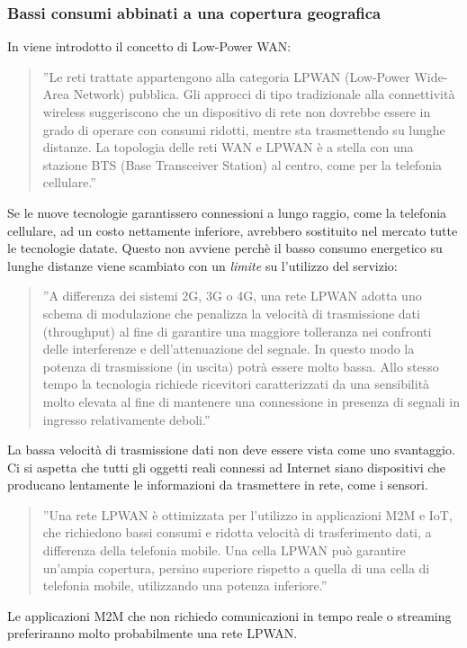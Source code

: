\documentclass[a4paper]{report} %
\begin{document}
\subsubsection{Bassi consumi abbinati a una copertura geografica}
In \cite{art:rif.23} viene introdotto il concetto di Low-Power WAN:
\begin{quote}
	''Le reti trattate appartengono alla categoria LPWAN (Low-Power Wide-Area Network) pubblica. Gli approcci di tipo tradizionale alla connettività wireless suggeriscono che un dispositivo di rete non dovrebbe essere in grado di operare con consumi ridotti, mentre sta trasmettendo su lunghe distanze. La topologia delle reti WAN e LPWAN è a stella con una stazione BTS (Base Transceiver Station) al centro, come per la telefonia cellulare.'' 
\end{quote}	
Se le nuove tecnologie garantissero connessioni a lungo raggio, come la telefonia cellulare, ad un costo nettamente inferiore, avrebbero sostituito nel mercato tutte le tecnologie datate. Questo non avviene perchè il basso consumo energetico su lunghe distanze viene scambiato con un \textit{limite} su l'utilizzo del servizio:
\begin{quote}
	''A differenza dei sistemi 2G, 3G o 4G, una rete LPWAN adotta uno schema di modulazione che penalizza la velocità di trasmissione dati (throughput) al fine di garantire una maggiore tolleranza nei confronti delle interferenze e dell'attenuazione del segnale. In questo modo la potenza di trasmissione (in uscita) potrà essere molto bassa. Allo stesso tempo la tecnologia richiede ricevitori caratterizzati da una sensibilità molto elevata al fine di mantenere una connessione in presenza di segnali in ingresso relativamente deboli.''
\end{quote}
La bassa velocità di trasmissione dati non deve essere vista come uno svantaggio. Ci si aspetta che tutti gli oggetti reali connessi ad Internet siano dispositivi che producano lentamente le informazioni da trasmettere in rete, come i sensori.
\begin{quote}	
	''Una rete LPWAN è ottimizzata per l'utilizzo in applicazioni M2M e IoT, che richiedono bassi consumi e ridotta velocità di trasferimento dati, a differenza della telefonia mobile. Una cella LPWAN può garantire un'ampia copertura, persino superiore rispetto a quella di una cella di telefonia mobile, utilizzando una potenza inferiore.''
\end{quote}
Le applicazioni M2M che non richiedo comunicazioni in tempo reale o streaming preferiranno molto probabilmente una rete LPWAN.
\end{document}
